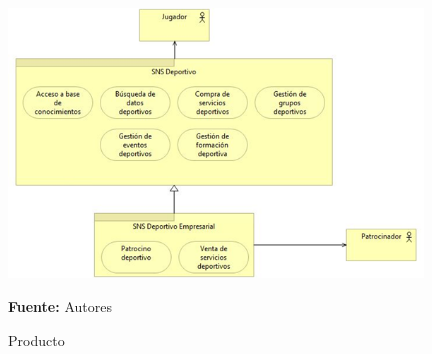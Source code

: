 \begin{figure}[!htb]
  \begin{center}
    \includegraphics[width=11cm]{./imagenes/Product.png}
    \caption{Producto}
    \label{fig:Product}
    \textbf{Fuente:}  Autores
  \end{center}
\end{figure}

\clearpage

